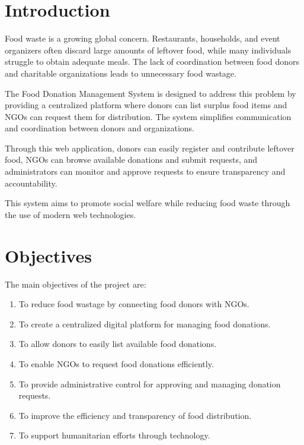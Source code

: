 \section{Introduction}

Food waste is a growing global concern. Restaurants, households, and event organizers often discard large amounts of leftover food, while many individuals struggle to obtain adequate meals. The lack of coordination between food donors and charitable organizations leads to unnecessary food wastage.

The Food Donation Management System is designed to address this problem by providing a centralized platform where donors can list surplus food items and NGOs can request them for distribution. The system simplifies communication and coordination between donors and organizations.

Through this web application, donors can easily register and contribute leftover food, NGOs can browse available donations and submit requests, and administrators can monitor and approve requests to ensure transparency and accountability.

This system aims to promote social welfare while reducing food waste through the use of modern web technologies.



\vspace{30pt}
\section{Objectives}

The main objectives of the project are:

\begin{enumerate}
\item To reduce food wastage by connecting food donors with NGOs.
\item To create a centralized digital platform for managing food donations.
\item To allow donors to easily list available food donations.
\item To enable NGOs to request food donations efficiently.
\item To provide administrative control for approving and managing donation requests.
\item To improve the efficiency and transparency of food distribution.
\item To support humanitarian efforts through technology.

\end{enumerate}

